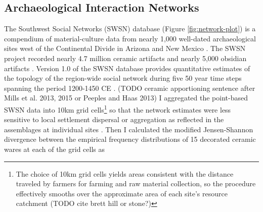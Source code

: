 \documentclass[10pt]{iopart}
\begin{document}
\subsection*{Archaeological Interaction Networks}
The Southwest Social Networks (SWSN) database (Figure \ref{fig:network-plot}) is a compendium of material-culture data from nearly 1,000 well-dated archaeological sites west of the Continental Divide in Arizona and New Mexico \parencite{Mills2012,Mills2013a,Peeples2013,Borck2015,Hill2015,Mills2015a}. The SWSN project recorded nearly 4.7 million ceramic artifacts and nearly 5,000 obsidian artifacts \parencite{Mills2015a}. Version 1.0 of the SWSN database provides quantitative estimates of the topology of the region-wide social network during five 50 year time steps spanning the period 1200-1450 CE \parencite{Mills2013a}. (TODO ceramic apportioning sentence after  Mills et al. 2013, 2015 or Peeples and Haas 2013) I aggregated the point-based SWSN data into 10km grid cells\footnote{The choice of 10km grid cells yields areas consistent with the distance traveled by farmers for farming and raw material collection, so the procedure effectively smooths over the approximate area of each site's resource catchment \parencite{Varien1999} (TODO cite brett hill or stone?)} so that the network estimates were less sensitive to local settlement dispersal or aggregation as reflected in the assemblages at individual sites \parencite{Paliou2016}. Then I calculated the modified Jensen-Shannon divergence between the empirical frequency distributions of 15 decorated ceramic wares at each of the grid cells as
\end{document}
